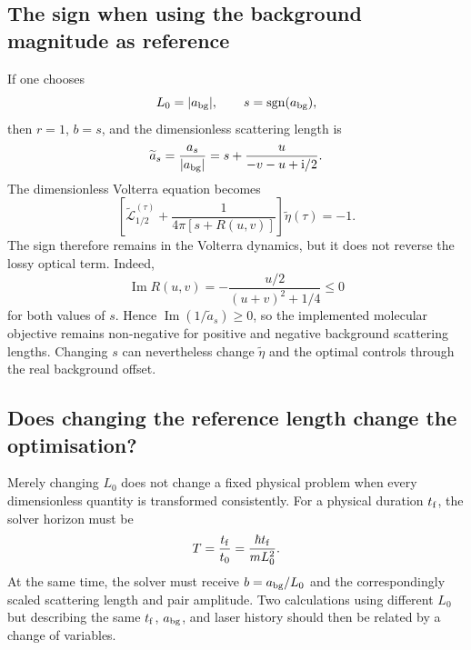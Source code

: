 \documentclass[9pt,a4paper,twocolumn,twoside]{rho-class/rho}
\newcommand{\ii}{\mathrm{i}}
\begin{document}
    \subsection{The sign when using the background magnitude as reference}

        If one chooses
        \begin{equation}
            L_0=|a_{\rm bg}|,
            \qquad s=\operatorname{sgn}(a_{\rm bg}),
        \end{equation}
        then $r=1$, $b=s$, and the dimensionless scattering length is
        \begin{equation}\label{eq:temporary-signed-background}
            \widetilde a_s
            =\frac{a_s}{|a_{\rm bg}|}
            =s+\frac{u}{-v-u+\ii/2}.
        \end{equation}
        The dimensionless Volterra equation becomes
        \begin{equation}\label{eq:temporary-signed-ratio-volterra}
            \left[
                \widetilde{\mathcal L}_{1/2}^{(\tau)}
                +\frac{1}{4\pi[s+R(u,v)]}
            \right]\widetilde\eta(\tau)=-1.
        \end{equation}
        The sign therefore remains in the Volterra dynamics, but it does not
        reverse the lossy optical term.  Indeed,
        \begin{equation}
            \operatorname{Im}R(u,v)
            =-\frac{u/2}{(u+v)^2+1/4}\leq0
        \end{equation}
        for both values of $s$.  Hence
        $\operatorname{Im}(1/\widetilde a_s)\geq0$, so the implemented
        molecular objective remains non-negative for positive and negative
        background scattering lengths.  Changing $s$ can nevertheless change
        $\widetilde\eta$ and the optimal controls through the real background
        offset.

    \subsection{Does changing the reference length change the optimisation?}

        Merely changing $L_0$ does not change a fixed physical problem when
        every dimensionless quantity is transformed consistently.  For a
        physical duration $t_{\rm f}$, the solver horizon must be
        \begin{equation}\label{eq:temporary-duration-conversion}
            T=\frac{t_{\rm f}}{t_0}
             =\frac{\hbar t_{\rm f}}{mL_0^2}.
        \end{equation}
        At the same time, the solver must receive
        $b=a_{\rm bg}/L_0$ and the correspondingly scaled scattering length and
        pair amplitude.  Two calculations using different $L_0$ but describing
        the same $t_{\rm f}$, $a_{\rm bg}$, and laser history should then be
        related by a change of variables.
\end{document}
